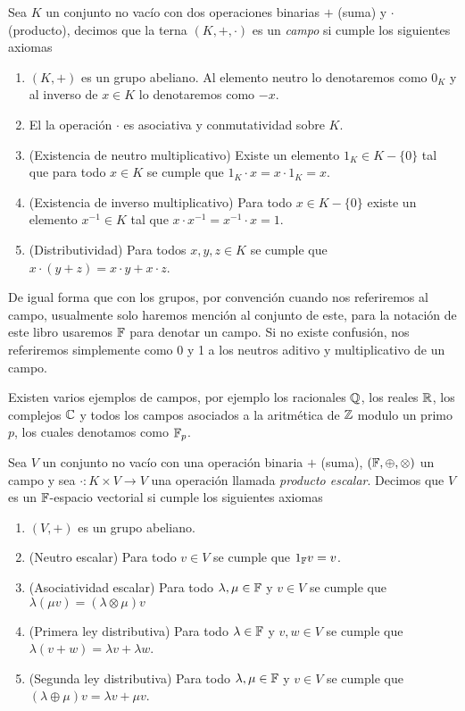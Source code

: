 \documentclass[11pt]{report}
\begin{document}
\begin{defi}
  Sea $K$ un conjunto no vacío con dos operaciones binarias $+$ (suma) y $\cdot$ (producto), decimos que la terna $(K, +, \cdot)$ es un \emph{campo} si cumple los siguientes axiomas
  \begin{enumerate}
    \item $(K,+)$ es un grupo abeliano. Al elemento neutro lo denotaremos como $0_K$ y al inverso de $x \in K$ lo denotaremos como $-x$.
    \item El la operación $\cdot$ es asociativa y conmutatividad sobre $K$.
    \item (Existencia de neutro multiplicativo) Existe un elemento $1_K \in K-\{0\}$ tal que para todo $x \in K$ se cumple que $1_K\cdot x = x\cdot 1_K = x$.
    \item (Existencia de inverso multiplicativo) Para todo $x \in K-\{0\}$ existe un elemento $ x^{-1} \in K$ tal que $x \cdot x^{-1} = x^{-1} \cdot x = 1$.
    \item (Distributividad) Para todos $x, y, z \in K$ se cumple que $x \cdot (y + z) = x \cdot y + x \cdot z$.
  \end{enumerate}
\end{defi}

De igual forma que con los grupos, por convención cuando nos referiremos al campo, usualmente solo haremos mención al conjunto de este, para la notación de este libro usaremos $\mathbb{F}$ para denotar un campo. Si no existe confusión, nos referiremos simplemente como 0 y 1 a los neutros aditivo y multiplicativo de un campo.

Existen varios ejemplos de campos, por ejemplo los racionales $\mathbb{Q}$, los reales $\mathbb{R}$, los complejos $\mathbb{C}$ y todos los campos asociados a la aritmética de $\mathbb{Z}$ modulo un primo $p$, los cuales denotamos como $\mathbb{F}_p$.

\begin{defi}
  Sea $V$ un conjunto no vacío con una operación binaria $+$ (suma), $(\mathbb{F}, \oplus, \otimes)$ un campo y sea $\cdot\colon K \times V \to V$ una operación llamada \emph{producto escalar}. Decimos que $V$ es un $\mathbb{F}$-espacio vectorial si cumple los siguientes axiomas
  \begin{enumerate}
    \item $(V, +)$ es un grupo abeliano.
    \item (Neutro escalar) Para todo $v \in V$ se cumple que $1_{\mathbb{F}} v = v$.
    \item (Asociatividad escalar) Para todo $\lambda, \mu \in \mathbb{F}$ y $v \in V$ se cumple que $\lambda (\mu v) = (\lambda \otimes \mu) v$
    \item (Primera ley distributiva) Para todo $\lambda \in \mathbb{F}$ y $v,w \in V$ se cumple que $\lambda(v + w) = \lambda v + \lambda w$.
    \item (Segunda ley distributiva) Para todo $\lambda, \mu \in \mathbb{F}$ y $v\in V$ se cumple que $(\lambda\oplus\mu)v = \lambda v + \mu v$.
  \end{enumerate}
\end{defi}
\end{document}
